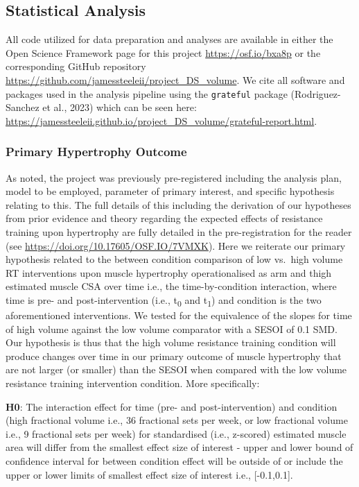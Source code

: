 \documentclass[
]{article}
\begin{document}
\subsection{Statistical Analysis}\label{statistical-analysis}

All code utilized for data preparation and analyses are available in
either the Open Science Framework page for this project
\url{https://osf.io/bxa8p} or the corresponding GitHub repository
\url{https://github.com/jamessteeleii/project_DS_volume}. We cite all
software and packages used in the analysis pipeline using the
\texttt{grateful} package (Rodriguez-Sanchez et al., 2023) which can be
seen here:
\url{https://jamessteeleii.github.io/project_DS_volume/grateful-report.html}.

\subsubsection{Primary Hypertrophy
Outcome}\label{primary-hypertrophy-outcome}

As noted, the project was previously pre-registered including the
analysis plan, model to be employed, parameter of primary interest, and
specific hypothesis relating to this. The full details of this including
the derivation of our hypotheses from prior evidence and theory
regarding the expected effects of resistance training upon hypertrophy
are fully detailed in the pre-registration for the reader (see
\url{https://doi.org/10.17605/OSF.IO/7VMXK}). Here we reiterate our
primary hypothesis related to the between condition comparison of low
vs.~high volume RT interventions upon muscle hypertrophy operationalised
as arm and thigh estimated muscle CSA over time i.e., the
time-by-condition interaction, where time is pre- and post-intervention
(i.e., t\textsubscript{0} and t\textsubscript{1}) and condition is the
two aforementioned interventions. We tested for the equivalence of the
slopes for time of high volume against the low volume comparator with a
SESOI of 0.1 SMD. Our hypothesis is thus that the high volume resistance
training condition will produce changes over time in our primary outcome
of muscle hypertrophy that are not larger (or smaller) than the SESOI
when compared with the low volume resistance training intervention
condition. More specifically:

\textbf{H0}: The interaction effect for time (pre- and
post-intervention) and condition (high fractional volume i.e., 36
fractional sets per week, or low fractional volume i.e., 9 fractional
sets per week) for standardised (i.e., z-scored) estimated muscle area
will differ from the smallest effect size of interest - upper and lower
bound of confidence interval for between condition effect will be
outside of or include the upper or lower limits of smallest effect size
of interest i.e., {[}-0.1,0.1{]}.
\end{document}

